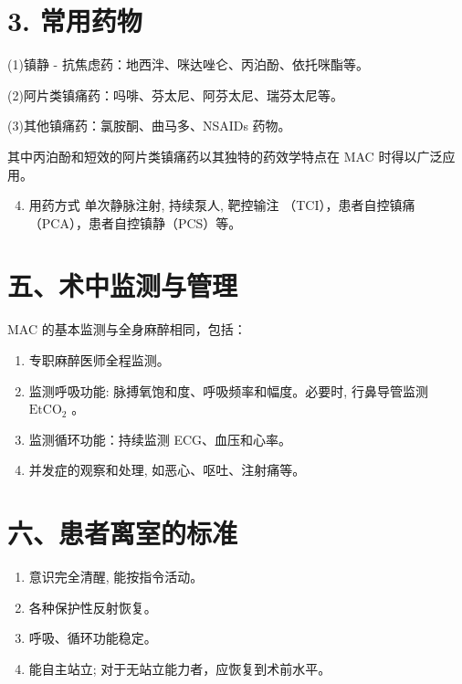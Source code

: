 \documentclass[10pt]{article}
\begin{document}
\section*{3. 常用药物}
(1)镇静 - 抗焦虑药：地西泮、咪达唑仑、丙泊酚、依托咪酯等。

(2)阿片类镇痛药：吗啡、芬太尼、阿芬太尼、瑞芬太尼等。

(3)其他镇痛药：氯胺酮、曲马多、NSAIDs 药物。

其中丙泊酚和短效的阿片类镇痛药以其独特的药效学特点在 MAC 时得以广泛应用。

\begin{enumerate}
  \setcounter{enumi}{3}
  \item 用药方式 单次静脉注射, 持续泵人, 靶控输注 （TCI），患者自控镇痛（PCA），患者自控镇静（PCS）等。
\end{enumerate}

\section*{五、术中监测与管理}
MAC 的基本监测与全身麻醉相同，包括：

\begin{enumerate}
  \item 专职麻醉医师全程监测。

  \item 监测呼吸功能: 脉搏氧饱和度、呼吸频率和幅度。必要时, 行鼻导管监测 $\mathrm{EtCO}_{2}$ 。

  \item 监测循环功能：持续监测 ECG、血压和心率。

  \item 并发症的观察和处理, 如恶心、呕吐、注射痛等。

\end{enumerate}

\section*{六、患者离室的标准}
\begin{enumerate}
  \item 意识完全清醒, 能按指令活动。

  \item 各种保护性反射恢复。

  \item 呼吸、循环功能稳定。

  \item 能自主站立; 对于无站立能力者，应恢复到术前水平。

\end{enumerate}
\end{document}

